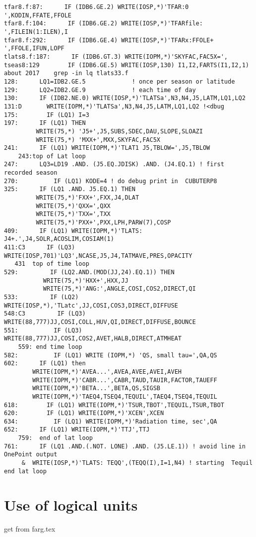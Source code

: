 \documentclass{article}
\begin{document}
\begin{verbatim}
tfar8.f:87:      IF (IDB6.GE.2) WRITE(IOSP,*)'TFAR:0 ',KODIN,FFATE,FFOLE
tfar8.f:104:      IF (IDB6.GE.2) WRITE(IOSP,*)'TFARfile: ',FILEIN(1:ILEN),I
tfar8.f:292:      IF (IDB6.GE.4) WRITE(IOSP,*)'TFARx:FFOLE+ ',FFOLE,IFUN,LOPF
tlats8.f:187:      IF (IDB6.GT.3) WRITE(IOPM,*)'SKYFAC,FAC5X=',
tseas8:129        IF (IDB6.GE.5) WRITE(IOSP,130) I1,I2,FARTS(I1,I2,1)
about 2017    grep -in lq tlats33.f
128:      LQ1=IDB2.GE.5             ! once per season or latitude
129:      LQ2=IDB2.GE.9             ! each time of day
130:      IF (IDB2.NE.0) WRITE(IOSP,*)'TLATSa',N3,N4,J5,LATM,LQ1,LQ2
131:D       WRITE(IOPM,*)'TLATSa',N3,N4,J5,LATM,LQ1,LQ2 !<dbug
175:        IF (LQ1) I=3
197:      IF (LQ1) THEN
         WRITE(75,*) 'J5+',J5,SUBS,SDEC,DAU,SLOPE,SLOAZI
         WRITE(75,*) 'MXX+',MXX,SKYFAC,FAC5X
241:      IF (LQ1) WRITE(IOPM,*)'TLAT1 J5,TBLOW=',J5,TBLOW
    243:top of Lat loop
247:      LQ3=LD19 .AND. (J5.EQ.JDISK) .AND. (J4.EQ.1) ! first recorded season
270:          IF (LQ1) KODE=4 ! do debug print in  CUBUTERP8
325:      IF (LQ1 .AND. J5.EQ.1) THEN
         WRITE(75,*)'FXX+',FXX,J4,DLAT
         WRITE(75,*)'QXX=',QXX 
         WRITE(75,*)'TXX=',TXX
         WRITE(75,*)'PXX+',PXX,LPH,PARW(7),COSP
409:      IF (LQ1) WRITE(IOPM,*)'TLATS: J4+.',J4,SOLR,ACOSLIM,COSIAM(1)
411:C3      IF (LQ3) WRITE(IOSP,701)'LQ3',NCASE,J5,J4,TATMAVE,PRES,OPACITY
   431  top of time loop
529:         IF (LQ2.AND.(MOD(JJ,24).EQ.1)) THEN
           WRITE(75,*)'HXX+',HXX,JJ
           WRITE(75,*)'ANG:',ANGLE,COSI,COS2,DIRECT,QI
533:         IF (LQ2) WRITE(IOSP,*),'TLatc',JJ,COSI,COS3,DIRECT,DIFFUSE 
548:C3         IF (LQ3) WRITE(88,777)JJ,COSI,COLL,HUV,QI,DIRECT,DIFFUSE,BOUNCE
551:          IF (LQ3) WRITE(88,777)JJ,COSI,COS2,AVET,HALB,DIRECT,ATMHEAT
    559: end time loop
582:          IF (LQ1) WRITE (IOPM,*) 'QS, small tau=',QA,QS
602:      IF (LQ1) then
        WRITE(IOPM,*)'AVEA...',AVEA,AVEE,AVEI,AVEH
        WRITE(IOPM,*)'CABR...',CABR,TAUD,TAUIR,FACTOR,TAUEFF
        WRITE(IOPM,*)'BETA...',BETA,QS,SIGSB 
        WRITE(IOPM,*)'TAEQ4,TSEQ4,TEQUIL',TAEQ4,TSEQ4,TEQUIL
618:        IF (LQ1) WRITE(IOPM,*)'TSUR,TBOT',TEQUIL,TSUR,TBOT 
620:        IF (LQ1) WRITE(IOPM,*)'XCEN',XCEN 
634:          IF (LQ1) WRITE(IOPM,*)'Radiation time, sec',QA 
652:      IF (LQ1) WRITE(IOPM,*)'TTJ',TTJ
    759:  end of lat loop
761:      IF (LQ1 .AND.(.NOT. LONE) .AND. (J5.LE.1)) ! avoid line in  OnePoint output
     &  WRITE(IOSP,*)'TLATS: TEQQ',(TEQQ(I),I=1,N4) ! starting  Tequil 
end lat loop
\end{verbatim}

\section{Use of logical units} %
 get from farg.tex
\end{document}
